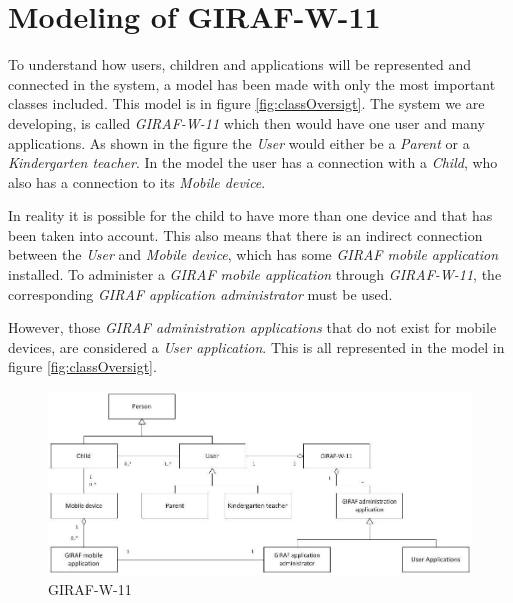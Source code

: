 \section{Modeling of GIRAF-W-11}
To understand how users, children and applications will be represented and connected in the system, a model has been made with only the most important classes included. This model is in figure \vref{fig:classOversigt}. The system we are developing, is called \emph{GIRAF-W-11} which then would have one user and many applications. As shown in the figure the \emph{User} would either be a \emph{Parent} or a \emph{Kindergarten teacher}. In the model the user has a connection with a \emph{Child}, who also has a connection to its \emph{Mobile device}.

In reality it is possible for the child to have more than one device and that has been taken into account. This also means that there is an indirect connection between the \emph{User} and \emph{Mobile device}, which has some \emph{GIRAF mobile application} installed. To administer a \emph{GIRAF mobile application} through \emph{GIRAF-W-11}, the corresponding \emph{GIRAF application administrator} must be used.

 However, those \emph{GIRAF administration applications} that do not exist for mobile devices, are considered a \emph{User application}. This is all represented in the model in figure \vref{fig:classOversigt}.


\begin{figure}[!ht]
	\centering
		\includegraphics[width=1.00\textwidth]{img/classOversigt.jpg}
	\caption{GIRAF-W-11}
	\label{fig:classOversigt}
\end{figure}
\newpage